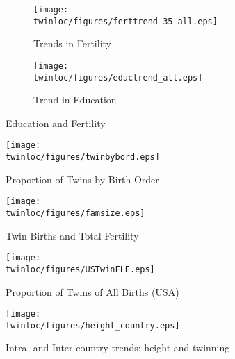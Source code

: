 \begin{figure}[htpb!]
\centering
\begin{subfigure}{.5\textwidth}
  \centering
  \texttt{[image: \\twinloc/figures/ferttrend\_35\_all.eps]}
  \caption{Trends in Fertility}
  \label{TWINfig:fertrend}
\end{subfigure}%
\begin{subfigure}{.5\textwidth}
  \centering
  \texttt{[image: \\twinloc/figures/eductrend\_all.eps]}
  \caption{Trend in Education}
  \label{TWINfig:eductrend}
\end{subfigure}
\caption{Education and Fertility}
\label{TWINfig:trends}
\end{figure}
\vspace{1cm}

\begin{figure}[htpb!]
\begin{center}
\caption{Proportion of Twins by Birth Order}
\label{TWINfig:bord}
\texttt{[image: \\twinloc/figures/twinbybord.eps]} 
\end{center}
\end{figure}

\begin{figure}[htpb!]
\begin{center}
\caption{Twin Births and Total Fertility}
\label{TWINfig:births}
\texttt{[image: \\twinloc/figures/famsize.eps]} 
\end{center}
\end{figure}

\begin{figure}[htpb!]
\begin{center}
\caption{Proportion of Twins of All Births (USA)}
\label{TWINfig:USTwin}
\texttt{[image: \\twinloc/figures/USTwinFLE.eps]} 
\end{center}
\end{figure}

\begin{landscape}
\begin{figure}[htpb!]
\begin{center}
\caption{Intra- and Inter-country trends: height and twinning}
\label{TWINfig:arrows}
\texttt{[image: \\twinloc/figures/height\_country.eps]} 
\end{center}
\end{figure}
\end{landscape}

